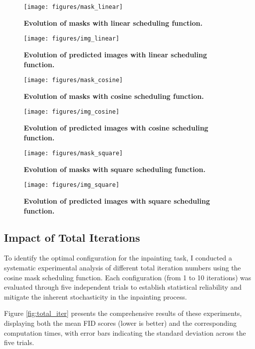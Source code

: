 \documentclass[twocolumn,a4paper]{article}
\begin{document}
\begin{figure}[H]
\centering
\texttt{[image: figures/mask\_linear]}
\caption{\textbf{Evolution of masks with linear scheduling function.}}
\label{fig:masklinear}
\end{figure}

\begin{figure}[H]
\centering
\texttt{[image: figures/img\_linear]}
\caption{\textbf{Evolution of predicted images with linear scheduling function.}}
\label{fig:imglinear}
\end{figure}

\begin{figure}[H]
\centering
\texttt{[image: figures/mask\_cosine]}
\caption{\textbf{Evolution of masks with cosine scheduling function.}}
\label{fig:maskcosine}
\end{figure}

\begin{figure}[H]
\centering
\texttt{[image: figures/img\_cosine]}
\caption{\textbf{Evolution of predicted images with cosine scheduling function.}}
\label{fig:imgcosine}
\end{figure}

\begin{figure}[H]
\centering
\texttt{[image: figures/mask\_square]}
\caption{\textbf{Evolution of masks with square scheduling function.}}
\label{fig:masksquare}
\end{figure}

\begin{figure}[H]
\centering
\texttt{[image: figures/img\_square]}
\caption{\textbf{Evolution of predicted images with square scheduling function.}}
\label{fig:imgsquare}
\end{figure}

\subsection{Impact of Total Iterations}

To identify the optimal configuration for the inpainting task, I conducted a systematic experimental analysis of different total iteration numbers using the cosine mask scheduling function. Each configuration (from 1 to 10 iterations) was evaluated through five independent trials to establish statistical reliability and mitigate the inherent stochasticity in the inpainting process.

Figure \ref{fig:total_iter} presents the comprehensive results of these experiments, displaying both the mean FID scores (lower is better) and the corresponding computation times, with error bars indicating the standard deviation across the five trials.
\end{document}
